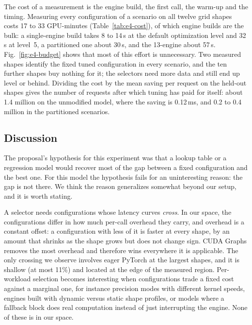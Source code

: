 The cost of a measurement is the engine build, the first call, the warm-up
and the timing. Measuring every configuration of a scenario on all twelve
grid shapes costs 17 to 33 GPU-minutes (Table~\ref{tab:e4-cost}), of which
engine builds are the bulk: a single-engine build takes 8 to 14\,s at the
default optimization level and 32\,s at level~5, a partitioned one about
30\,s, and the 13-engine  about 57\,s.
Fig.~\ref{fig:e4-budget} shows that most of this effort is unnecessary. Two
measured shapes identify the fixed tuned configuration in every scenario, and
the ten further shapes buy nothing for it; the selectors need more data and
still end up level or behind. Dividing the cost by the mean saving per request
on the held-out shapes gives the number of requests after which tuning has
paid for itself: about 1.4 million on the unmodified model, where the saving
is 0.12\,ms, and 0.2 to 0.4 million in the partitioned scenarios.

\subsection{Discussion}
\label{sec:e4-discussion}

The proposal's hypothesis for this experiment was that a lookup table or a
regression model would recover most of the gap between a fixed configuration
and the best one. For this model the hypothesis fails for an uninteresting
reason: the gap is not there. We think the reason generalizes somewhat beyond
our setup, and it is worth stating.

A selector needs configurations whose latency curves \emph{cross}. In our
space, the configurations differ in how much per-call overhead they carry, and
overhead is a constant offset: a configuration with less of it is faster at
every shape, by an amount that shrinks as the shape grows but does not change
sign. CUDA Graphs removes the most overhead and therefore wins everywhere it
is applicable. The only crossing we observe involves eager PyTorch at the
largest shapes, and it is shallow (at most 11\%) and located at the edge of
the measured region. Per-workload selection becomes interesting when
configurations trade a fixed cost against a marginal one, for instance
precision modes with different kernel speeds, engines built with dynamic
versus static shape profiles, or models where a fallback block does real
computation instead of just interrupting the engine. None of these is in our
space.

